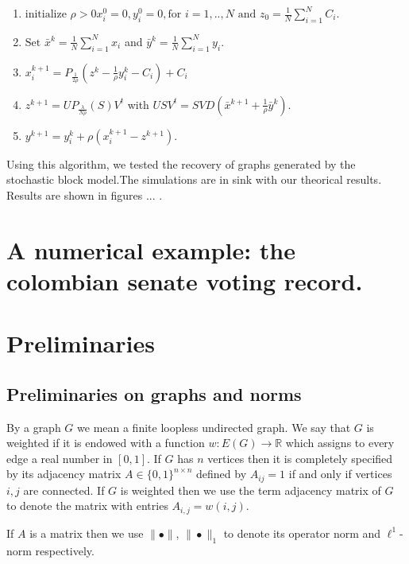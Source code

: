 \documentclass[12pt]{amsart}
\theoremstyle{remark}
\newcommand{\RR}{\mathbb{R}}
\begin{document}
\begin{enumerate}
\item $\text{initialize } \rho >0 x_i^0=0, y_i^0=0, \text{for } i=1,..,N \text{ and } z_0= \frac{1}{N}\sum_{i=1}^N C_i$.
\item $ \text{Set } \bar{x}^{k} = \frac{1}{N}\sum_{i=1}^N x_i $ and $\bar{y}^{k} = \frac{1}{N}\sum_{i=1}^N y_i $.
\item $x_i^{k+1}=P_{\frac{1}{2\rho}}(z^k-\frac{1}{\rho}y_i^k-C_i)+C_i$
\item $z^{k+1} = UP_{\frac{\lambda}{N\rho}}(S)V^t$ with $USV^t = SVD(\bar{x}^{k+1}+\frac{1}{\rho}\bar{y}^k)$.
\item $y^{k+1} =y_i^k + \rho(x_i^{k+1}-z^{k+1}). $ 

\end{enumerate}


Using this algorithm, we tested the recovery of graphs generated by the stochastic block model.The simulations are in sink with our theorical results.  Results are shown in figures ... .



\section{A numerical example: the colombian senate voting record.}

\section{Preliminaries}





\subsection{ Preliminaries on graphs and norms}

By a graph $G$ we mean a finite loopless undirected graph. We say that $G$ is weighted if it is endowed with a function $w: E(G)\rightarrow \RR$ which assigns to every edge a real number in $[0,1]$. If $G$ has $n$ vertices then it is completely specified by its adjacency matrix $A\in \{0,1\}^{n\times n}$ defined by $A_{ij}=1$ if and only if vertices $i,j$ are connected. If $G$ is weighted then we use the term adjacency matrix of $G$ to denote the matrix with entries $A_{i,j}=w(i,j)$. 

If $A$ is a matrix then we use $\|\bullet\|$, $\|\bullet\|_1$ to denote its operator norm and $\ell^1$-norm respectively.







\end{document}

